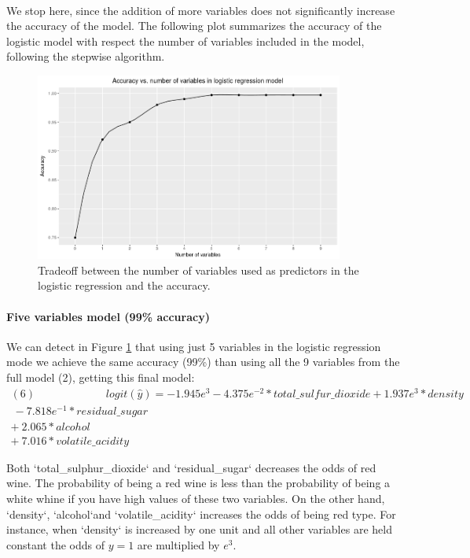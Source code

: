 \documentclass[10pt]{article}
\begin{document}
\paragraph*{}
We stop here, since the addition of more variables does not significantly increase the accuracy of the model. The following plot summarizes the accuracy of the logistic model with respect the number of variables included in the model, following the stepwise algorithm.


\begin{figure}[H]
	\centering
	\includegraphics[width=4in]{figures/accuracy-model.png} 
	\caption{Tradeoff between the number of variables used as predictors in the logistic regression and the accuracy.}
	\label{figure:accuracy-model}
\end{figure}

\paragraph{Five variables model (99\% accuracy)}
We can detect in Figure \ref{figure:accuracy-model} that using just 5 variables in the logistic regression mode we achieve the same accuracy (99\%) than using all the 9 variables from the full model (2), getting this final model:
\begin{equation*}
\begin{aligned}	
(6) \ \ \ \ \ \ \ \ \ \ \ \ \ \  \ \ \ \ \ \ \ \ \ \ \ \ \ \  \   logit(\hat{y}) = -1.945e^{3}  -4.375e^{-2}*total\_sulfur\_dioxide + 1.937e^{3}*density \\ \  -7.818e^{-1}*residual\_sugar \\  + \ 2.065*alcohol \\ + \ 7.016*volatile\_acidity
\end{aligned}
\end{equation*}	

Both `total\_sulphur\_dioxide` and `residual\_sugar` decreases the odds of red wine. The probability of being a red wine is less than the probability of being a white whine if you have high values of these two variables. On the other hand, `density`, `alcohol`and `volatile\_acidity` increases the odds of being red type. For instance, when `density` is increased by one unit and all other variables are held constant the odds of $y = 1$ are multiplied by $e^{3}$.
\end{document}
